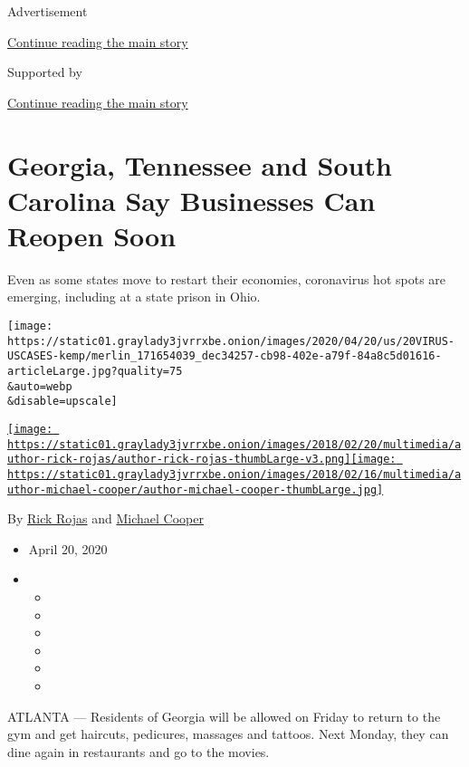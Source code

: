 Advertisement

\protect\hyperlink{after-top}{Continue reading the main story}

Supported by

\protect\hyperlink{after-sponsor}{Continue reading the main story}

\hypertarget{georgia-tennessee-and-south-carolina-say-businesses-can-reopen-soon}{%
\section{Georgia, Tennessee and South Carolina Say Businesses Can Reopen
Soon}\label{georgia-tennessee-and-south-carolina-say-businesses-can-reopen-soon}}

Even as some states move to restart their economies, coronavirus hot
spots are emerging, including at a state prison in Ohio.

\texttt{[image: https://static01.graylady3jvrrxbe.onion/images/2020/04/20/us/20VIRUS-USCASES-kemp/merlin\_171654039\_dec34257-cb98-402e-a79f-84a8c5d01616-articleLarge.jpg?quality=75\\\&auto=webp\\\&disable=upscale]}

\href{https://www.nytimes3xbfgragh.onion/by/rick-rojas}{\texttt{[image: https://static01.graylady3jvrrxbe.onion/images/2018/02/20/multimedia/author-rick-rojas/author-rick-rojas-thumbLarge-v3.png]}}\href{https://www.nytimes3xbfgragh.onion/by/michael-cooper}{\texttt{[image: https://static01.graylady3jvrrxbe.onion/images/2018/02/16/multimedia/author-michael-cooper/author-michael-cooper-thumbLarge.jpg]}}

By \href{https://www.nytimes3xbfgragh.onion/by/rick-rojas}{Rick Rojas}
and \href{https://www.nytimes3xbfgragh.onion/by/michael-cooper}{Michael
Cooper}

\begin{itemize}
\item
  April 20, 2020
\item
  \begin{itemize}
  \item
  \item
  \item
  \item
  \item
  \item
  \end{itemize}
\end{itemize}

ATLANTA --- Residents of Georgia will be allowed on Friday to return to
the gym and get haircuts, pedicures, massages and tattoos. Next Monday,
they can dine again in restaurants and go to the movies.

